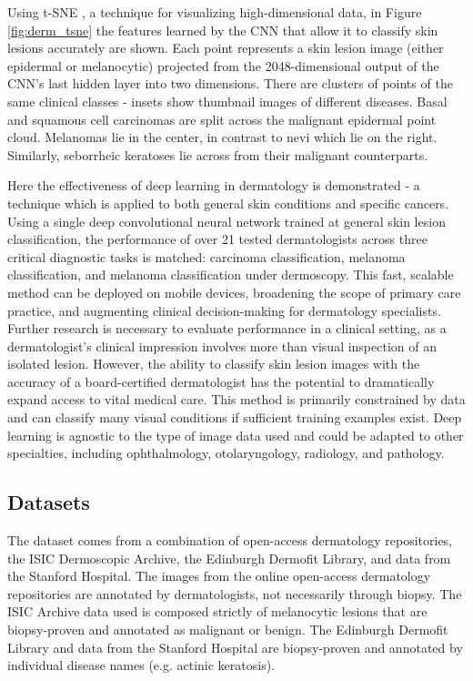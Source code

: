 Using t-SNE \cite{van2008visualizing}, a technique for visualizing high-dimensional data, in Figure \ref{fig:derm_tsne} the features learned by the CNN that allow it to classify skin lesions accurately are shown. Each point represents a skin lesion image (either epidermal or melanocytic) projected from the 2048-dimensional output of the CNN’s last hidden layer into two dimensions.  There are clusters of points of the same clinical classes - insets show thumbnail images of different diseases. Basal and squamous cell carcinomas are split across the malignant epidermal point cloud. Melanomas lie in the center, in contrast to nevi which lie on the right. Similarly, seborrheic keratoses lie across from their malignant counterparts. 

Here the effectiveness of deep learning in dermatology is demonstrated - a technique which is applied to both general skin conditions and specific cancers. Using a single deep convolutional neural network trained at general skin lesion classification, the performance of over 21 tested dermatologists across three critical diagnostic tasks is matched: carcinoma classification, melanoma classification, and melanoma classification under dermoscopy. This fast, scalable method can be deployed on mobile devices, broadening the scope of primary care practice, and augmenting clinical decision-making for dermatology specialists. Further research is necessary to evaluate performance in a clinical setting, as a dermatologist’s clinical impression involves more than visual inspection of an isolated lesion. However, the ability to classify skin lesion images with the accuracy of a board-certified dermatologist has the potential to dramatically expand access to vital medical care. This method is primarily constrained by data and can classify many visual conditions if sufficient training examples exist. Deep learning is agnostic to the type of image data used and could be adapted to other specialties, including ophthalmology, otolaryngology, radiology, and pathology. 

\subsection{Datasets}
The dataset comes from a combination of open-access dermatology repositories, the ISIC Dermoscopic Archive, the Edinburgh Dermofit Library, and data from the Stanford Hospital. The images from the online open-access dermatology repositories are annotated by dermatologists, not necessarily through biopsy. The ISIC Archive data used is composed strictly of melanocytic lesions that are biopsy-proven and annotated as malignant or benign. The Edinburgh Dermofit Library and data from the Stanford Hospital are biopsy-proven and annotated by individual disease names (e.g. actinic keratosis). 

